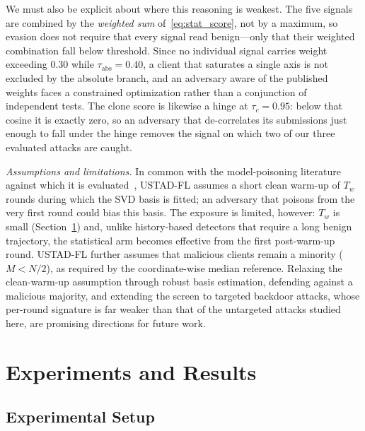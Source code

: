 \documentclass[journal]{IEEEtran}
\begin{document}
We must also be explicit about where this reasoning is weakest. The five signals are combined by the \emph{weighted sum} of~\eqref{eq:stat_score}, not by a maximum, so evasion does not require that every signal read benign---only that their weighted combination fall below threshold. Since no individual signal carries weight exceeding $0.30$ while $\tau_{\mathrm{abs}} = 0.40$, a client that saturates a single axis is not excluded by the absolute branch, and an adversary aware of the published weights faces a constrained optimization rather than a conjunction of independent tests. The clone score is likewise a hinge at $\tau_c = 0.95$: below that cosine it is exactly zero, so an adversary that de-correlates its submissions just enough to fall under the hinge removes the signal on which two of our three evaluated attacks are caught.

\noindent\textit{Assumptions and limitations.} In common with the model-poisoning literature against which it is evaluated~\cite{baruch2019little, shejwalkar2021manipulating}, USTAD-FL assumes a short clean warm-up of $T_w$ rounds during which the SVD basis is fitted; an adversary that poisons from the very first round could bias this basis. The exposure is limited, however: $T_w$ is small (Section~\ref{sec:experiments}) and, unlike history-based detectors that require a long benign trajectory, the statistical arm becomes effective from the first post-warm-up round. USTAD-FL further assumes that malicious clients remain a minority ($M < N/2$), as required by the coordinate-wise median reference. Relaxing the clean-warm-up assumption through robust basis estimation, defending against a malicious majority, and extending the screen to targeted backdoor attacks, whose per-round signature is far weaker than that of the untargeted attacks studied here, are promising directions for future work.

\section{Experiments and Results}
\label{sec:experiments}

\subsection{Experimental Setup}
\end{document}
